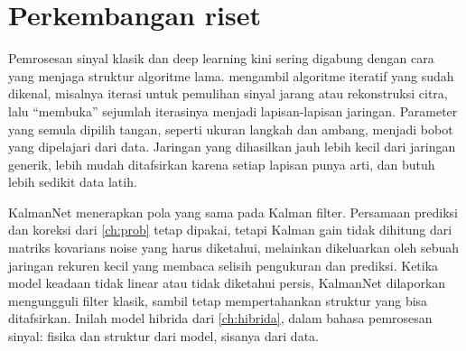 \section{Perkembangan riset}

Pemrosesan sinyal klasik dan deep learning kini sering digabung dengan cara yang menjaga struktur algoritme lama.
 \citep{monga2021} mengambil algoritme iteratif yang sudah dikenal, misalnya iterasi untuk
pemulihan sinyal jarang atau rekonstruksi citra, lalu ``membuka'' sejumlah iterasinya menjadi lapisan-lapisan jaringan.
Parameter yang semula dipilih tangan, seperti ukuran langkah dan ambang, menjadi bobot yang dipelajari dari data.
Jaringan yang dihasilkan jauh lebih kecil dari jaringan generik, lebih mudah ditafsirkan karena setiap lapisan punya
arti, dan butuh lebih sedikit data latih.

KalmanNet \citep{revach2022} menerapkan pola yang sama pada Kalman filter. Persamaan prediksi dan koreksi dari
\cref{ch:prob} tetap dipakai, tetapi Kalman gain tidak dihitung dari matriks kovarians noise yang harus diketahui,
melainkan dikeluarkan oleh sebuah jaringan rekuren kecil yang membaca selisih pengukuran dan prediksi. Ketika model
keadaan tidak linear atau tidak diketahui persis, KalmanNet dilaporkan mengungguli filter klasik, sambil tetap
mempertahankan struktur yang bisa ditafsirkan. Inilah model hibrida dari \cref{ch:hibrida}, dalam bahasa pemrosesan
sinyal: fisika dan struktur dari model, sisanya dari data.

